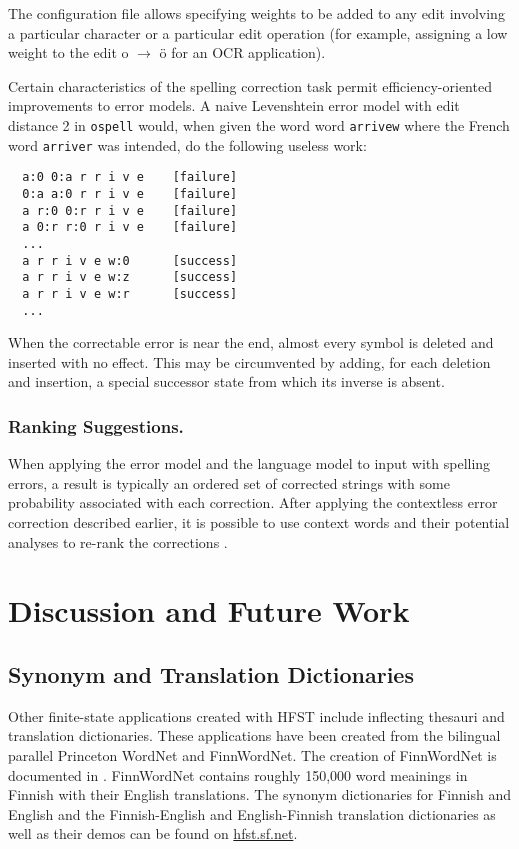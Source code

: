 \documentclass{llncs}
\begin{document}
The configuration file allows specifying weights to be added to any edit
involving a particular character or a particular edit operation (for example,
assigning a low weight to the edit o $\rightarrow$ ö for an OCR application).

Certain characteristics of the spelling correction task permit
efficiency-oriented improvements to error models. A naive Levenshtein error
model with edit distance 2 in \verb!ospell! would, when given the word
word \verb!arrivew! where the French word \verb!arriver! was intended,
do the following useless work:

{\scriptsize
\begin{verbatim}
  a:0 0:a r r i v e    [failure]
  0:a a:0 r r i v e    [failure]
  a r:0 0:r r i v e    [failure]
  a 0:r r:0 r i v e    [failure]
  ...
  a r r i v e w:0      [success]
  a r r i v e w:z      [success]
  a r r i v e w:r      [success]
  ...
\end{verbatim}
}

When the correctable error is near the end, almost every symbol is deleted and
inserted with no effect. This may be circumvented by adding, for each deletion
and insertion, a special successor state from which its inverse is absent.

\subsubsection{Ranking Suggestions.}

When applying the error model and the language model to input with spelling errors,
a result is typically an ordered set of corrected strings with some probability
associated with each correction. After applying the contextless error correction
described earlier, it is possible to use context words and their potential
analyses to re-rank the corrections \cite{pirinen/2012/cicling}.


\section{Discussion and Future Work}\label{Discussion}

\subsection{Synonym and Translation Dictionaries}

Other finite-state applications created with HFST include inflecting thesauri and translation dictionaries.
These applications have been created from the bilingual parallel Princeton WordNet and FinnWordNet. 
The creation of FinnWordNet is documented in \cite{linden/2010}. FinnWordNet contains roughly 150,000 
word meainings in Finnish with their English translations. The synonym dictionaries for Finnish and English and the Finnish-English and English-Finnish translation dictionaries as well as their demos can be found on \url{hfst.sf.net}.
\end{document}
